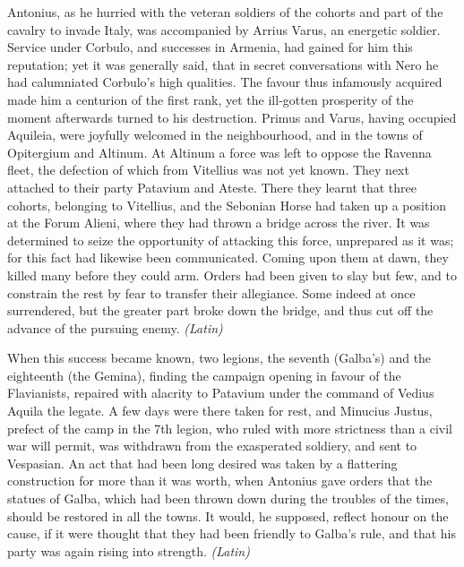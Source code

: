 
Antonius, as he hurried with the veteran soldiers of the cohorts and part of the cavalry to invade Italy, was accompanied by Arrius Varus, an energetic soldier. Service under Corbulo, and successes in Armenia, had gained for him this reputation; yet it was generally said, that in secret conversations with Nero he had calumniated Corbulo's high qualities. The favour thus infamously acquired made him a centurion of the first rank, yet the ill-gotten prosperity of the moment afterwards turned to his destruction. Primus and Varus, having occupied Aquileia, were joyfully welcomed in the neighbourhood, and in the towns of Opitergium and Altinum. At Altinum a force was left to oppose the Ravenna fleet, the defection of which from Vitellius was not yet known. They next attached to their party Patavium and Ateste. There they learnt that three cohorts, belonging to Vitellius, and the Sebonian Horse had taken up a position at the Forum Alieni, where they had thrown a bridge across the river. It was determined to seize the opportunity of attacking this force, unprepared as it was; for this fact had likewise been communicated. Coming upon them at dawn, they killed many before they could arm. Orders had been given to slay but few, and to constrain the rest by fear to transfer their allegiance. Some indeed at once surrendered, but the greater part broke down the bridge, and thus cut off the advance of the pursuing enemy. \emph{(Latin)}


When this success became known, two legions, the seventh (Galba's) and the eighteenth (the Gemina), finding the campaign opening in favour of the Flavianists, repaired with alacrity to Patavium under the command of Vedius Aquila the legate. A few days were there taken for rest, and Minucius Justus, prefect of the camp in the 7th legion, who ruled with more strictness than a civil war will permit, was withdrawn from the exasperated soldiery, and sent to Vespasian. An act that had been long desired was taken by a flattering construction for more than it was worth, when Antonius gave orders that the statues of Galba, which had been thrown down during the troubles of the times, should be restored in all the towns. It would, he supposed, reflect honour on the cause, if it were thought that they had been friendly to Galba's rule, and that his party was again rising into strength. \emph{(Latin)}


